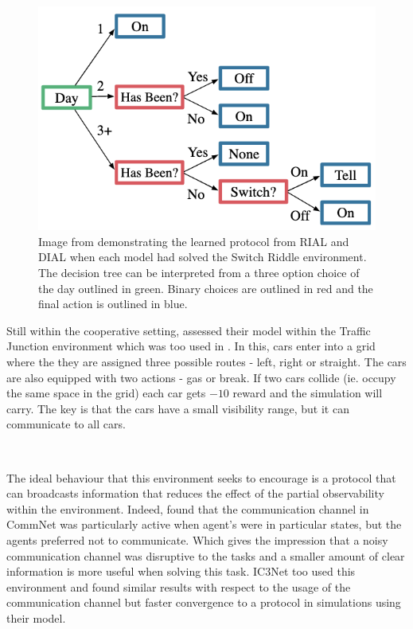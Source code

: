 \documentclass{article}
\begin{document}
\

\begin{figure}
	\centering
	\includegraphics{images/switch_riddle}
	\caption{Image from \citet{foerster2016learning} demonstrating the learned protocol from RIAL and DIAL when each model had solved the Switch Riddle environment. The decision tree can be interpreted from a three option choice of the day outlined in green. Binary choices are outlined in red and the final action is outlined in blue. }
	\label{fig:switch_riddle_solution}
\end{figure}

Still within the cooperative setting, \citet{sukhbaatar2016commnet} assessed their model within the Traffic Junction environment which was too used in \citet{singh2018ic3net}. In this, cars enter into a grid where the they are assigned three possible routes - left, right or straight. The cars are also equipped with two actions - gas or break. If two cars collide (ie. occupy the same space in the grid) each car gets $-10$ reward and the simulation will carry. The key is that the cars have a small visibility range, but it can communicate to all cars.

\

The ideal behaviour that this environment seeks to encourage is a protocol that can broadcasts information that reduces the effect of the partial observability within the environment. Indeed, \citet{sukhbaatar2016commnet} found that the communication channel in CommNet was particularly active when agent's were in particular states, but the agents preferred not to communicate. Which gives the impression that a noisy communication channel was disruptive to the tasks and a smaller amount of clear information is more useful when solving this task. IC3Net \citep{singh2018ic3net} too used this environment and found similar results with respect to the usage of the communication channel but faster convergence to a protocol in simulations using their model.
\end{document}
